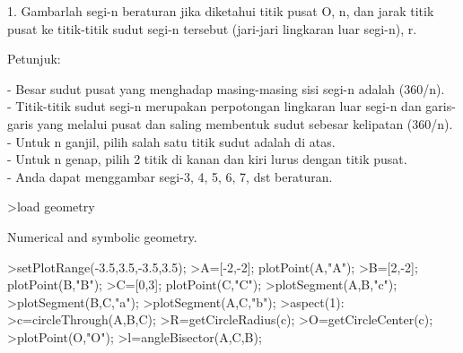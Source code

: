 \documentclass[a4paper,10pt]{article}
\begin{document}
\begin{eulernotebook}
\begin{eulercomment}
\begin{eulercomment}
\begin{eulercomment}
\begin{eulercomment}
\begin{eulercomment}
\begin{eulercomment}
\begin{eulercomment}
\begin{eulercomment}
\begin{eulercomment}
\begin{eulercomment}
\begin{eulercomment}
\begin{eulercomment}
\begin{eulercomment}
\begin{eulercomment}
\begin{eulercomment}
\begin{eulercomment}
\begin{eulercomment}
\begin{eulercomment}
\begin{eulercomment}
\begin{eulercomment}
\begin{eulercomment}
\begin{eulercomment}
\begin{eulercomment}
\begin{eulercomment}
\begin{eulercomment}
\begin{eulercomment}
\begin{eulercomment}
\begin{eulercomment}
\begin{eulercomment}
\begin{eulercomment}
\begin{eulercomment}
\begin{eulercomment}
\begin{eulercomment}
\begin{eulercomment}
\begin{eulercomment}
\begin{eulercomment}
\begin{eulercomment}
\begin{eulercomment}
\begin{eulercomment}
\begin{eulercomment}
\begin{eulercomment}
\begin{eulercomment}
\begin{eulercomment}
1. Gambarlah segi-n beraturan jika diketahui titik pusat O, n, dan
jarak titik pusat ke titik-titik sudut segi-n tersebut (jari-jari
lingkaran luar segi-n), r.

Petunjuk:

- Besar sudut pusat yang menghadap masing-masing sisi segi-n adalah
(360/n).\\
- Titik-titik sudut segi-n merupakan perpotongan lingkaran luar segi-n
dan garis-garis yang melalui pusat dan saling membentuk sudut sebesar
kelipatan (360/n).\\
- Untuk n ganjil, pilih salah satu titik sudut adalah di atas.\\
- Untuk n genap, pilih 2 titik di kanan dan kiri lurus dengan titik
pusat.\\
- Anda dapat menggambar segi-3, 4, 5, 6, 7, dst beraturan.
\end{eulercomment}
\begin{eulerprompt}
>load geometry
\end{eulerprompt}
\begin{euleroutput}
  Numerical and symbolic geometry.
\end{euleroutput}
\begin{eulerprompt}
>setPlotRange(-3.5,3.5,-3.5,3.5);
>A=[-2,-2]; plotPoint(A,"A");
>B=[2,-2]; plotPoint(B,"B");
>C=[0,3]; plotPoint(C,"C");
>plotSegment(A,B,"c");
>plotSegment(B,C,"a");
>plotSegment(A,C,"b");
>aspect(1):
>c=circleThrough(A,B,C);
>R=getCircleRadius(c);
>O=getCircleCenter(c);
>plotPoint(O,"O");
>l=angleBisector(A,C,B);

\end{eulerprompt}
\end{eulercomment}
\end{eulercomment}
\end{eulercomment}
\end{eulercomment}
\end{eulercomment}
\end{eulercomment}
\end{eulercomment}
\end{eulercomment}
\end{eulercomment}
\end{eulercomment}
\end{eulercomment}
\end{eulercomment}
\end{eulercomment}
\end{eulercomment}
\end{eulercomment}
\end{eulercomment}
\end{eulercomment}
\end{eulercomment}
\end{eulercomment}
\end{eulercomment}
\end{eulercomment}
\end{eulercomment}
\end{eulercomment}
\end{eulercomment}
\end{eulercomment}
\end{eulercomment}
\end{eulercomment}
\end{eulercomment}
\end{eulercomment}
\end{eulercomment}
\end{eulercomment}
\end{eulercomment}
\end{eulercomment}
\end{eulercomment}
\end{eulercomment}
\end{eulercomment}
\end{eulercomment}
\end{eulercomment}
\end{eulercomment}
\end{eulercomment}
\end{eulercomment}
\end{eulercomment}
\end{eulernotebook}
\end{document}

